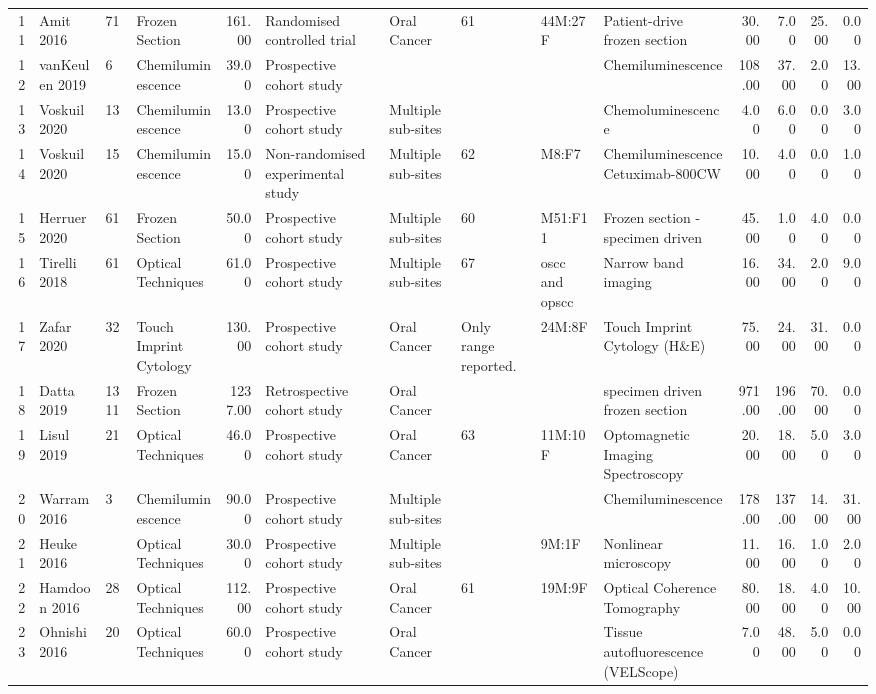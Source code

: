 \begin{table}[ht]
\begin{tabular}{rlllrlllllrrrr}
  11 & Amit 2016 & 71 & Frozen Section & 161.00 & Randomised controlled trial & Oral Cancer & 61 & 44M:27F & Patient-drive frozen section & 30.00 & 7.00 & 25.00 & 0.00 \\ 
  12 & vanKeulen 2019 & 6 & Chemiluminescence & 39.00 & Prospective cohort study &  &  &  & Chemiluminescence & 108.00 & 37.00 & 2.00 & 13.00 \\ 
  13 & Voskuil 2020 & 13 & Chemiluminescence & 13.00 & Prospective cohort study & Multiple sub-sites &  &  & Chemoluminescence & 4.00 & 6.00 & 0.00 & 3.00 \\ 
  14 & Voskuil 2020 & 15 & Chemiluminescence & 15.00 & Non-randomised experimental study & Multiple sub-sites & 62 & M8:F7 & Chemiluminescence Cetuximab-800CW & 10.00 & 4.00 & 0.00 & 1.00 \\ 
  15 & Herruer 2020 & 61 & Frozen Section & 50.00 & Prospective cohort study & Multiple sub-sites & 60 & M51:F11 & Frozen section - specimen driven & 45.00 & 1.00 & 4.00 & 0.00 \\ 
  16 & Tirelli 2018 & 61 & Optical Techniques & 61.00 & Prospective cohort study & Multiple sub-sites & 67 & oscc and opscc & Narrow band imaging & 16.00 & 34.00 & 2.00 & 9.00 \\ 
  17 & Zafar 2020 & 32 & Touch Imprint Cytology & 130.00 & Prospective cohort study & Oral Cancer & Only range reported. & 24M:8F & Touch Imprint Cytology (H\&E) & 75.00 & 24.00 & 31.00 & 0.00 \\ 
  18 & Datta 2019 & 1311 & Frozen Section & 1237.00 & Retrospective cohort study & Oral Cancer &  &  & specimen driven frozen section & 971.00 & 196.00 & 70.00 & 0.00 \\ 
  19 & Lisul 2019 & 21 & Optical Techniques & 46.00 & Prospective cohort study & Oral Cancer & 63 & 11M:10F & Optomagnetic Imaging Spectroscopy & 20.00 & 18.00 & 5.00 & 3.00 \\ 
  20 & Warram 2016 & 3 & Chemiluminescence & 90.00 & Prospective cohort study & Multiple sub-sites &  &  & Chemiluminescence & 178.00 & 137.00 & 14.00 & 31.00 \\ 
  21 & Heuke 2016 &  & Optical Techniques & 30.00 & Prospective cohort study & Multiple sub-sites &  & 9M:1F & Nonlinear microscopy & 11.00 & 16.00 & 1.00 & 2.00 \\ 
  22 & Hamdoon 2016 & 28 & Optical Techniques & 112.00 & Prospective cohort study & Oral Cancer & 61 & 19M:9F & Optical Coherence Tomography & 80.00 & 18.00 & 4.00 & 10.00 \\ 
  23 & Ohnishi 2016 & 20 & Optical Techniques & 60.00 & Prospective cohort study & Oral Cancer &  &  & Tissue autofluorescence (VELScope) & 7.00 & 48.00 & 5.00 & 0.00 \\ 

\end{tabular}
\end{table}
